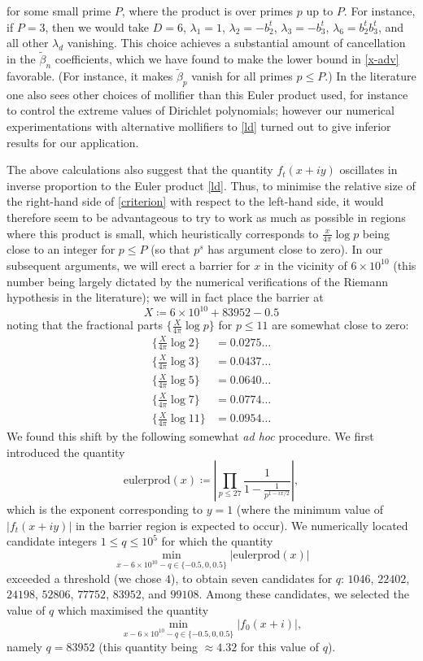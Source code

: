 for some small prime $P$, where the product is over primes $p$ up to $P$.  For instance, if $P = 3$, then we would take $D=6$, $\lambda_1 = 1$, $\lambda_2 = - b_2^t$, $\lambda_3 = -b_3^t$, $\lambda_6 = b_2^t b_3^t$, and all other $\lambda_d$ vanishing.  This choice achieves a substantial amount of cancellation in the $\tilde \beta_n$ coefficients, which we have found to make the lower bound in \eqref{x-adv} favorable.  (For instance, it makes $\tilde \beta_p$ vanish for all primes $p \leq P$.)  In the literature one also sees other choices of mollifier than this Euler product used, for instance to control the extreme values of Dirichlet polynomials; however our numerical experimentations with alternative mollifiers to \eqref{ld} turned out to give inferior results for our application.

The above calculations also suggest that the quantity $f_t(x+iy)$ oscillates in inverse proportion to the Euler product \eqref{ld}.  Thus, to minimise the relative size of the right-hand side of \eqref{criterion} with respect to the left-hand side, it would therefore seem to be advantageous to try to work as much as possible in regions where this product is small, which heuristically corresponds to $\frac{x}{4\pi} \log p$ being close to an integer for $p \leq P$ (so that $p^s$ has argument close to zero).  In our subsequent arguments, we will erect a barrier for $x$ in the vicinity of $6 \times 10^{10}$ (this number being largely dictated by the numerical verifications of the Riemann hypothesis in the literature); we will in fact place the barrier at
$$ X \coloneqq 6 \times 10^{10} + 83952 - 0.5$$
noting that the fractional parts $\{ \frac{X}{4\pi} \log p\}$ for $p \leq 11$ are somewhat close to zero:
\begin{align*}
\{ \frac{X}{4\pi} \log 2 \} &= 0.0275\dots \\
\{ \frac{X}{4\pi} \log 3 \} &= 0.0437\dots \\
\{ \frac{X}{4\pi} \log 5 \} &= 0.0640\dots \\
\{ \frac{X}{4\pi} \log 7 \} &= 0.0774\dots\\
\{ \frac{X}{4\pi} \log 11 \} &= 0.0954\dots
\end{align*}
We found this shift by the following somewhat \emph{ad hoc} procedure.  We first introduced the quantity
$$ \mathrm{eulerprod}(x) \coloneqq \left|\prod\limits_{p \leq 27}\frac{1}{1-\frac{1}{p^{1-ix/2}}}\right|,$$
which is the  exponent corresponding to $y=1$ (where the minimum value of $|f_t(x+iy)|$ in the barrier region is expected to occur).  We numerically located candidate integers $1 \leq q \leq 10^5$ for which the quantity
$$ \min_{x - 6 \times 10^{10} - q \in \{-0.5,0,0.5\}} |\mathrm{eulerprod}(x)|$$
exceeded a threshold (we chose $4$), to obtain seven candidates for $q$: $1046$, $22402$, $24198$, $52806$, $77752$, $83952$, and $99108$.  Among these candidates, we selected the value of $q$ which maximised the quantity
$$ \min_{x - 6 \times 10^{10} - q \in \{-0.5,0,0.5\}} |f_0(x+i)|,$$
namely $q = 83952$ (this quantity being $\approx 4.32$ for this value of $q$).

